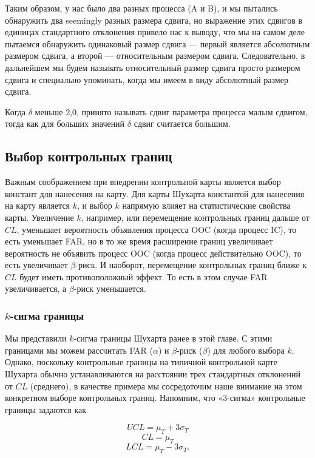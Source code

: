Таким образом, у нас было два разных процесса (A и B), и мы пытались обнаружить два seemingly разных размера сдвига, но выражение этих сдвигов в единицах стандартного отклонения привело нас к выводу, что мы на самом деле пытаемся обнаружить одинаковый размер сдвига — первый является абсолютным размером сдвига, а второй — относительным размером сдвига. Следовательно, в дальнейшем мы будем называть относительный размер сдвига просто размером сдвига и специально упоминать, когда мы имеем в виду абсолютный размер сдвига.

Когда \(\delta\) меньше 2,0, принято называть сдвиг параметра процесса малым сдвигом, тогда как для больших значений \(\delta\) сдвиг считается большим.

\subsection{Выбор контрольных границ}

Важным соображением при внедрении контрольной карты является выбор констант для нанесения на карту. Для карты Шухарта константой для нанесения на карту является \(k\), и выбор \(k\) напрямую влияет на статистические свойства карты. Увеличение \(k\), например, или перемещение контрольных границ дальше от \(CL\), уменьшает вероятность объявления процесса OOC (когда процесс IC), то есть уменьшает FAR, но в то же время расширение границ увеличивает вероятность не объявить процесс OOC (когда процесс действительно OOC), то есть увеличивает \(\beta\)-риск. И наоборот, перемещение контрольных границ ближе к \(CL\) будет иметь противоположный эффект. То есть в этом случае FAR увеличивается, а \(\beta\)-риск уменьшается.

\subsubsection{\(k\)-сигма границы}

Мы представили \(k\)-сигма границы Шухарта ранее в этой главе. С этими границами мы можем рассчитать FAR (\(\alpha\)) и \(\beta\)-риск (\(\beta\)) для любого выбора \(k\). Однако, поскольку контрольные границы на типичной контрольной карте Шухарта обычно устанавливаются на расстоянии трех стандартных отклонений от \(CL\) (среднего), в качестве примера мы сосредоточим наше внимание на этом конкретном выборе контрольных границ. Напомним, что «3-сигма» контрольные границы задаются как

\[
UCL = \mu_T + 3\sigma_T
\]
\[
CL = \mu_T
\]
\[
LCL = \mu_T - 3\sigma_T.
\]

